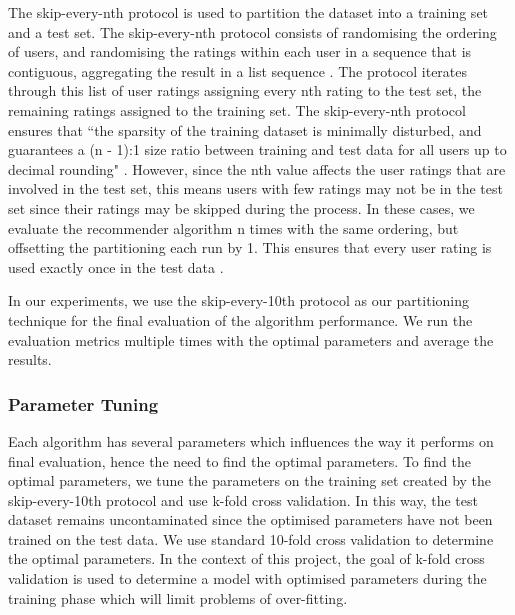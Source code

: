 The skip-every-nth protocol \cite{zhang} is used to partition the dataset into a training set and a test set. The skip-every-nth protocol consists of randomising the ordering of users, and randomising the ratings within each user in a sequence that is contiguous, aggregating the result in a list sequence \cite{zhang}. The protocol iterates through this list of user ratings assigning every nth rating to the test set, the remaining ratings assigned to the training set. The skip-every-nth protocol ensures that ``the sparsity of the training dataset is minimally disturbed, and guarantees a (n - 1):1 size ratio between training and test data for all users up to decimal rounding" \cite{zhang}. However, since the nth value affects the user ratings that are involved in the test set, this means users with few ratings may not be in the test set since their ratings may be skipped during the process. 
 In these cases, we evaluate the recommender algorithm n times with the same ordering, but offsetting the partitioning each run by 1. This ensures that every user rating is used exactly once in the test data \cite{zhang}. 

In our experiments, we use the skip-every-10th protocol as our partitioning technique for the final evaluation of the algorithm performance. We run the evaluation metrics multiple times with the optimal parameters and average the results. 

\subsubsection{Parameter Tuning}

Each algorithm has several parameters which influences the way it performs on final evaluation, hence the need to find the optimal parameters. To find the optimal parameters, we tune the parameters on the training set created by the skip-every-10th protocol and use k-fold cross validation. In this way, the test dataset remains uncontaminated since the optimised parameters have not been trained on the test data. 
We use standard 10-fold cross validation to determine the optimal parameters. In the context of this project, the goal of k-fold cross validation is used to determine a model with optimised parameters during the training phase which will limit problems of over-fitting. 

